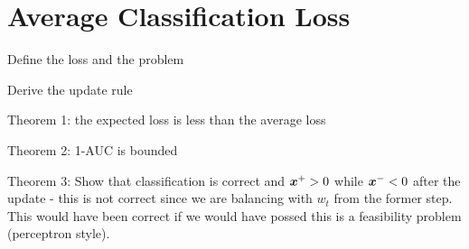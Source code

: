 \section{Average Classification Loss}

Define the loss and the problem

Derive the update rule


Theorem 1: the expected loss is less than the average loss

Theorem 2: 1-AUC is bounded 

Theorem 3: Show that classification is correct and $\bm{x}^+ >0$ while $\bm{x}^- < 0$ after the update - this is not correct since we are balancing with $w_t$ from the former step.
This would have been correct if we would have possed this is a feasibility problem (perceptron style).
